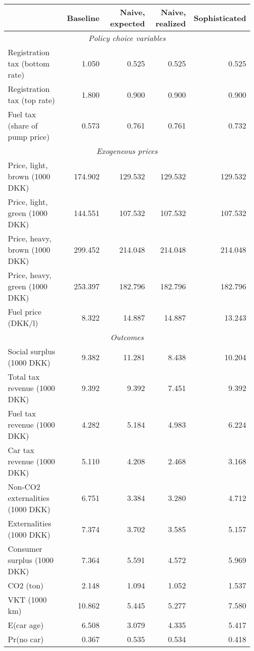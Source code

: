 

\begin{tabular}{lrrrr} 
\toprule 
                                         &     Baseline& Naive, expected& Naive, realized& Sophisticated \\ 
\midrule 
\multicolumn{5}{c}{\emph{Policy choice variables}} \\ 
\midrule
          Registration tax (bottom rate) &        1.050&        0.525&        0.525&        0.525 \\ 
             Registration tax (top rate) &        1.800&        0.900&        0.900&        0.900 \\ 
          Fuel tax (share of pump price) &        0.573&        0.761&        0.761&        0.732 \\ 
\midrule 
\multicolumn{5}{c}{\emph{Exogeneous prices}} \\ 
\midrule
          Price, light, brown (1000 DKK) &      174.902&      129.532&      129.532&      129.532 \\ 
          Price, light, green (1000 DKK) &      144.551&      107.532&      107.532&      107.532 \\ 
          Price, heavy, brown (1000 DKK) &      299.452&      214.048&      214.048&      214.048 \\ 
          Price, heavy, green (1000 DKK) &      253.397&      182.796&      182.796&      182.796 \\ 
                      Fuel price (DKK/l) &        8.322&       14.887&       14.887&       13.243 \\ 
\midrule 
\multicolumn{5}{c}{\emph{Outcomes}} \\ 
\midrule
               Social surplus (1000 DKK) &        9.382&       11.281&        8.438&       10.204 \\ 
            Total tax revenue (1000 DKK) &        9.392&        9.392&        7.451&        9.392 \\ 
             Fuel tax revenue (1000 DKK) &        4.282&        5.184&        4.983&        6.224 \\ 
              Car tax revenue (1000 DKK) &        5.110&        4.208&        2.468&        3.168 \\ 
        Non-CO2 externalities (1000 DKK) &        6.751&        3.384&        3.280&        4.712 \\ 
                Externalities (1000 DKK) &        7.374&        3.702&        3.585&        5.157 \\ 
             Consumer surplus (1000 DKK) &        7.364&        5.591&        4.572&        5.969 \\ 
                               CO2 (ton) &        2.148&        1.094&        1.052&        1.537 \\ 
                           VKT (1000 km) &       10.862&        5.445&        5.277&        7.580 \\ 
                              E(car age) &        6.508&        3.079&        4.335&        5.417 \\ 
                              Pr(no car) &        0.367&        0.535&        0.534&        0.418 \\ 
\bottomrule 
\end{tabular}
